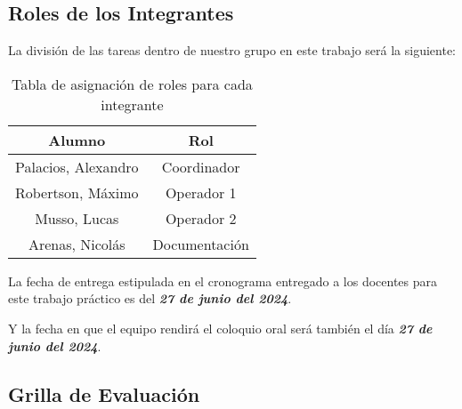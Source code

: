 
\subsection{Roles de los Integrantes}

La división de las tareas dentro de nuestro grupo en este trabajo será la siguiente: 

\begin{table}[H]
    \centering
    \begin{tabular}{|c|c|}
    \hline
        Alumno & Rol \\
    \hline
        Palacios, Alexandro & Coordinador \\ 
        Robertson, Máximo & Operador 1 \\
        Musso, Lucas & Operador 2 \\
        Arenas, Nicolás & Documentación \\
    \hline
        \end{tabular}
        \def\tablename{Tabla} 
        \caption{Tabla de asignación de roles para cada integrante}
        \label{tab:roles}
\end{table}

La fecha de entrega estipulada en el cronograma entregado a los docentes para este trabajo práctico es del \textbf{\textit{27 de junio del 2024}}.

Y la fecha en que el equipo rendirá el coloquio oral será también el día \textbf{\textit{27 de junio del 2024}}.



\subsection{Grilla de Evaluación}

